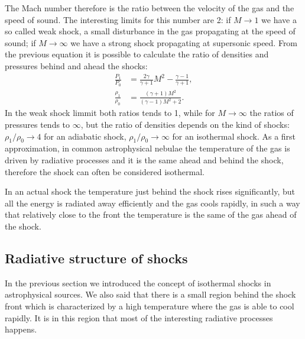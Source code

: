 \documentclass[../thesis.tex]{subfiles}
\begin{document}
The Mach number therefore is the ratio between the velocity of the gas and the speed of sound.
The interesting limits for this number are 2: if $M\to 1$ we have a so called weak shock, a small disturbance in the gas propagating at the speed of sound; if $M\to\infty$ we have a strong shock propagating at supersonic speed.
From the previous equation it is possible to calculate the ratio of densities and pressures behind and ahead the shocks:
\begin{align}
    \label{eq:ratios1}
    \frac{P_1}{P_0} & = \frac{2\gamma}{\gamma+1}M^2 -\frac{\gamma-1}{\gamma+1},\\
    \label{eq:ratios2}
    \frac{\rho_1}{\rho_0} & = \frac{(\gamma+1)M^2}{(\gamma-1)M^2+2}.
\end{align}
In the weak shock limmit both ratios tends to 1, while for $M\to\infty$ the ratios of pressures tends to $\infty$, but the ratio of densities depends on the kind of shocks: $\rho_1/\rho_0 \to 4$ for an adiabatic shock, $\rho_1/\rho_0 \to \infty$ for an isothermal shock.
As a first approximation, in common astrophysical nebulae the temperature of the gas is driven by radiative processes and it is the same ahead and behind the shock, therefore the shock can often be considered isothermal.

In an actual shock the temperature just behind the shock rises significantly, but all the energy is radiated away efficiently and the gas cools rapidly, in such a way that relatively close to the front the temperature is the same of the gas ahead of the shock.

\subsection{Radiative structure of shocks}

In the previous section we introduced the concept of isothermal shocks in astrophysical sources.
We also said that there is a small region behind the shock front which is characterized by a high temperature where the gas is able to cool rapidly.
It is in this region that most of the interesting radiative processes happens.
\end{document}
